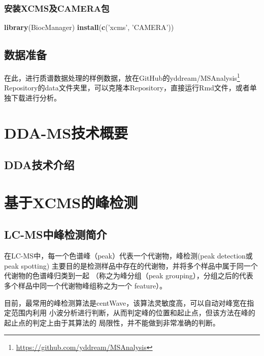 \documentclass[]{ctexbook}
\newenvironment{Shaded}{\begin{snugshade}}{\end{snugshade}}
\newcommand{\KeywordTok}[1]{\textcolor[rgb]{0.13,0.29,0.53}{\textbf{#1}}}
\newcommand{\NormalTok}[1]{#1}
\newcommand{\StringTok}[1]{\textcolor[rgb]{0.31,0.60,0.02}{#1}}
\renewcommand{\href}[2]{#2\footnote{\url{#1}}}
\begin{document}
\hypertarget{xcmscamera}{%
\subsection{安装XCMS及CAMERA包}\label{xcmscamera}}

\begin{Shaded}
\begin{Highlighting}[]
\KeywordTok{library}\NormalTok{(BiocManager)}
\KeywordTok{install}\NormalTok{(}\KeywordTok{c}\NormalTok{(}\StringTok{'xcms'}\NormalTok{, }\StringTok{'CAMERA'}\NormalTok{))}
\end{Highlighting}
\end{Shaded}

\section{数据准备}

在此，进行质谱数据处理的样例数据，放在GitHub的\href{https://github.com/yddream/MSAnalysis}{yddream/MSAnalysis}
Repository的data文件夹里，可以克隆本Repository，直接运行Rmd文件，或者单独下载进行分析。

\mainmatter

\hypertarget{chapDDA}{%
\chapter{DDA-MS技术概要}\label{chapDDA}}

\hypertarget{dda}{%
\section{DDA技术介绍}\label{dda}}

\hypertarget{chapPD}{%
\chapter{基于XCMS的峰检测}\label{chapPD}}

\hypertarget{lc-ms}{%
\section{LC-MS中峰检测简介}\label{lc-ms}}

在LC-MS中，每一个色谱峰（peak）代表一个代谢物，峰检测(peak detection或peak spotting)
主要目的是检测样品中存在的代谢物，并将多个样品中属于同一个代谢物的色谱峰归类到一起
（称之为峰分组（peak grouping），分组之后的代表多个样品中同一个代谢物峰组称之为一个
feature）。

目前，最常用的峰检测算法是centWave，该算法灵敏度高，可以自动对峰宽在指定范围内利用
小波分析进行判断，从而判定峰的位置和起止点，但该方法在峰的起止点的判定上由于其算法的
局限性，并不能做到非常准确的判断。
\end{document}
